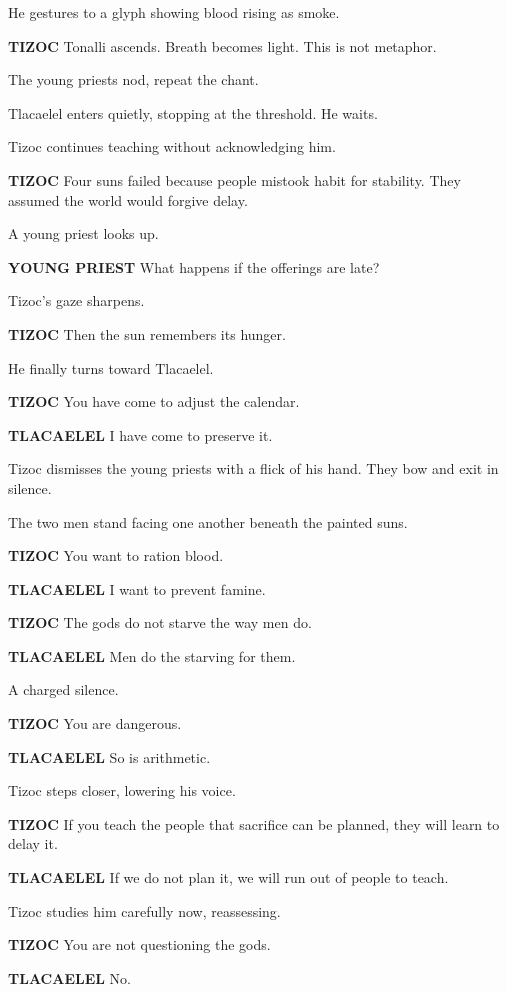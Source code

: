 \documentclass[12pt]{article}
\begin{document}
He gestures to a glyph showing blood rising as smoke.

\textbf{TIZOC}  
Tonalli ascends.  
Breath becomes light.  
This is not metaphor.

The young priests nod, repeat the chant.

Tlacaelel enters quietly, stopping at the threshold. He waits.

Tizoc continues teaching without acknowledging him.

\textbf{TIZOC}  
Four suns failed because people mistook habit for stability.  
They assumed the world would forgive delay.

A young priest looks up.

\textbf{YOUNG PRIEST}  
What happens if the offerings are late?

Tizoc’s gaze sharpens.

\textbf{TIZOC}  
Then the sun remembers its hunger.

He finally turns toward Tlacaelel.

\textbf{TIZOC}  
You have come to adjust the calendar.

\textbf{TLACAELEL}  
I have come to preserve it.

Tizoc dismisses the young priests with a flick of his hand. They bow and exit in silence.

The two men stand facing one another beneath the painted suns.

\textbf{TIZOC}  
You want to ration blood.

\textbf{TLACAELEL}  
I want to prevent famine.

\textbf{TIZOC}  
The gods do not starve the way men do.

\textbf{TLACAELEL}  
Men do the starving for them.

A charged silence.

\textbf{TIZOC}  
You are dangerous.

\textbf{TLACAELEL}  
So is arithmetic.

Tizoc steps closer, lowering his voice.

\textbf{TIZOC}  
If you teach the people that sacrifice can be planned,  
they will learn to delay it.

\textbf{TLACAELEL}  
If we do not plan it,  
we will run out of people to teach.

Tizoc studies him carefully now, reassessing.

\textbf{TIZOC}  
You are not questioning the gods.

\textbf{TLACAELEL}  
No.
\end{document}
